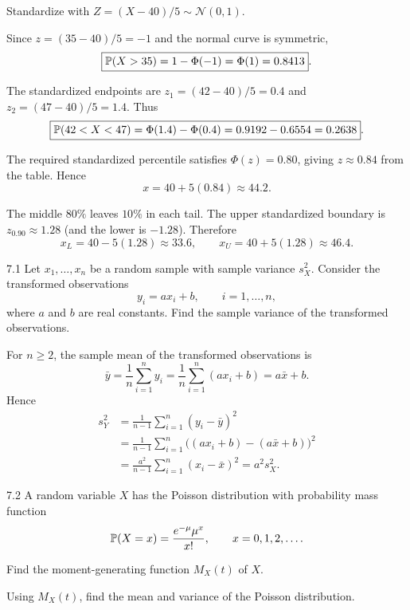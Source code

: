 \documentclass[11pt,oneside]{article}
\begin{document}
\begin{solution}
Standardize with $Z=(X-40)/5\sim\mathcal N(0,1)$.
\begin{problemsubparts}
\item Since $z=(35-40)/5=-1$ and the normal curve is symmetric,
\[
\boxed{\mathbb{P}(X>35)=1-\Phi(-1)=\Phi(1)=0.8413}.
\]
\item The standardized endpoints are $z_1=(42-40)/5=0.4$ and $z_2=(47-40)/5=1.4$. Thus
\[
\boxed{\mathbb{P}(42<X<47)=\Phi(1.4)-\Phi(0.4)=0.9192-0.6554=0.2638}.
\]
\item The required standardized percentile satisfies $\Phi(z)=0.80$, giving $z\approx0.84$ from the table. Hence
\[
\boxed{x=40+5(0.84)\approx44.2}.
\]
\item The middle $80\%$ leaves $10\%$ in each tail. The upper standardized boundary is $z_{0.90}\approx1.28$ (and the lower is $-1.28$). Therefore
\[
\boxed{x_L=40-5(1.28)\approx33.6},\qquad
\boxed{x_U=40+5(1.28)\approx46.4}.
\]
\end{problemsubparts}
\end{solution}


\begin{problem}{7.1}
Let $x_1, \ldots, x_n$ be a random sample with sample variance $s_X^2$. Consider the transformed observations
\[
y_i=ax_i+b, \qquad i=1, \ldots, n,
\]
where $a$ and $b$ are real constants. Find the sample variance of the transformed observations.
\end{problem}

\begin{solution}
For $n\ge2$, the sample mean of the transformed observations is
\[
\bar y=\frac1n\sum_{i=1}^n y_i
=\frac1n\sum_{i=1}^n(ax_i+b)
=a\bar x+b.
\]
Hence
\[
\begin{aligned}
s_Y^2
&=\frac{1}{n-1}\sum_{i=1}^n(y_i-\bar y)^2\\
&=\frac{1}{n-1}\sum_{i=1}^n\bigl((ax_i+b)-(a\bar x+b)\bigr)^2\\
&=\frac{a^2}{n-1}\sum_{i=1}^n(x_i-\bar x)^2
=\boxed{a^2s_X^2}.
\end{aligned}
\]
\end{solution}

\begin{problem}{7.2}
A random variable $X$ has the Poisson distribution with probability mass function
\[
\mathbb{P}(X=x)=\frac{e^{-\mu}\mu^x}{x!},\qquad x=0, 1, 2, \ldots.
\]
\begin{problemsubparts}
\item Find the moment-generating function $M_X(t)$ of $X$.
\item Using $M_X(t)$, find the mean and variance of the Poisson distribution.
\end{problemsubparts}
\end{problem}
\end{document}
